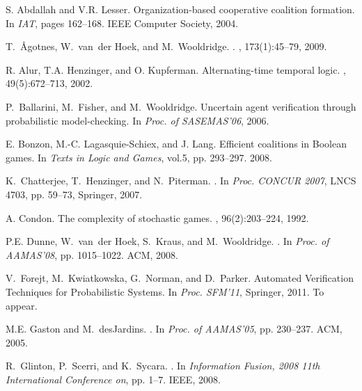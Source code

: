\documentclass{llncs}
\begin{document}
\small{

\begin{thebibliography}{10}

S. Abdallah and V.R. Lesser.
\newblock Organization-based cooperative coalition formation.
\newblock In {\em IAT}, pages 162--168. IEEE Computer Society, 2004.

T.~{\AA}gotnes, W.~van~der Hoek, and M.~Wooldridge.
.
, 173(1):45--79, 2009.

R. Alur, T.A. Henzinger, and O. Kupferman.
\newblock Alternating-time temporal logic.
, 49(5):672--713, 2002.

P.~Ballarini, M.~Fisher, and M.~Wooldridge.
\newblock Uncertain agent verification through probabilistic model-checking.
\newblock In {\em Proc. of SASEMAS'06}, 2006.

E. Bonzon, M.-C. Lagasquie-Schiex, and J. Lang.
\newblock Efficient coalitions in {B}oolean games.
\newblock In {\em Texts in Logic
  and Games}, vol.5,
  pp. 293--297. 2008.

K.~Chatterjee, T.~Henzinger, and N.~Piterman.
.
\newblock In {\em Proc. CONCUR 2007}, LNCS 4703, pp. 59--73, Springer, 2007.

A. Condon.
\newblock The complexity of stochastic games.
, 96(2):203--224, 1992.

P.E. Dunne, W.~van~der Hoek, S.~Kraus, and M.~Wooldridge.
.
\newblock In {\em Proc. of AAMAS'08}, pp. 1015--1022. ACM, 2008.

V.~Forejt, M.~Kwiatkowska, G.~Norman, and D.~Parker.
\newblock Automated Verification Techniques for Probabilistic Systems.
\newblock In {\em Proc. SFM'11}, Springer, 2011. To appear.

M.E. Gaston and M.~desJardins.
.
\newblock In {\em Proc. of AAMAS'05}, pp. 230--237. ACM, 2005.

R.~Glinton, P.~Scerri, and K.~Sycara.
.
\newblock In {\em Information Fusion, 2008 11th International Conference on},
  pp. 1--7. IEEE, 2008.


\end{thebibliography}}
\end{document}
